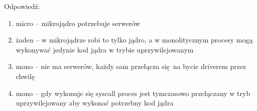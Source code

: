 Odpowiedź:
\begin{enumerate}
	\item micro -- mikrojądro potrzebuje serwerów
	\item żaden -- w mikrojądrze robi to tylko jądro, a w monolitycznym procesy mogą wykonywać jedynie kod jądra w trybie uprzywilejowanym
	\item mono -- nie ma serwerów, każdy sam przełącza się na bycie driverem przez chwilę
	\item mono -- gdy wykonuje się syscall proces jest tymczasowo przełączany w tryb uprzywilejowany aby wykonać potrzebny kod jądra
\end{enumerate}